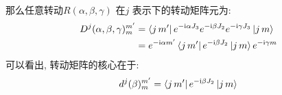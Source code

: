 那么任意转动$R(\alpha, \beta, \gamma)$ 在$j$ 表示下的转动矩阵元为:
\begin{equation}
  \begin{aligned}
    D^{j}(\alpha,\beta, \gamma)^{m'}_{m} &= \bra{j\,m'}e^{- {\rm i} \alpha J_3}e^{- {\rm i} \beta J_2}e^{- {\rm i} \gamma J_3} \ket{j\,m}\\
    &= e^{- {\rm i} \alpha m'} \bra{j\,m'}e^{- {\rm i} \beta J_2} \ket{j\,m} e^{- {\rm i} \gamma m}
  \end{aligned}
\end{equation}
可以看出, 转动矩阵的核心在于:
\begin{equation}
  \begin{aligned}
    d^{j}(\beta)^{m'}_{m} = \bra{j\,m'}e^{- {\rm i} \beta J_2} \ket{j\,m}
  \end{aligned}
\end{equation}
